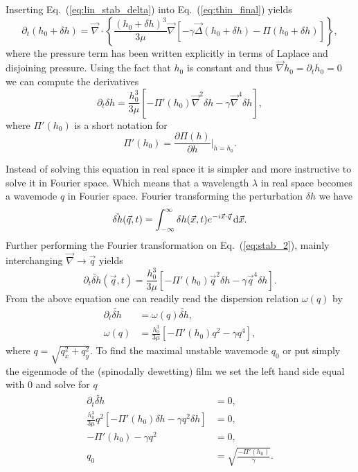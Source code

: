 Inserting Eq.~(\ref{eq:lin_stab_delta}) into Eq.~(\ref{eq:thin_final}) yields
\begin{equation}\label{eq:stab_1}
    \partial_t (h_0 + \delta h) = \vec{\nabla}\cdot\left\{\frac{(h_0 + \delta h)^3}{3\mu}\vec{\nabla} [-\gamma\vec{\Delta}(h_0 + \delta h) - \Pi(h_0 + \delta h)]\right\},
\end{equation}
where the pressure term has been written explicitly in terms of Laplace and disjoining pressure.
Using the fact that $h_0$ is constant and thus $\vec{\nabla} h_0 = \partial_t h_0= 0$ we can compute the derivatives
\begin{equation}\label{eq:stab_2}
    \partial_t \delta h = \frac{h_0^3}{3\mu}\left[-\Pi'(h_0)\vec{\nabla}^2\delta h -\gamma\vec{\nabla}^4\delta h\right],
\end{equation}
where $\Pi'(h_0)$ is a short notation for
\begin{equation}\label{eq:deriva_Pi}
    \Pi'(h_0) = \frac{\partial\Pi(h)}{\partial h}\bigg\rvert_{h=h_0}.
\end{equation}

Instead of solving this equation in real space it is simpler and more instructive to solve it in Fourier space.
Which means that a wavelength $\lambda$ in real space becomes a wavemode $q$ in Fourier space. 
Fourier transforming the perturbation $\delta h$ we have 
\begin{equation}\label{eq:fourier_h}
    \tilde{\delta h}(\vec{q},t) = \int_{-\infty}^{\infty} \delta h(\vec{x},t) e^{-i\vec{x}\cdot\vec{q}} \mathop{}\!\mathrm{d}\vec{x}.    
\end{equation}
Further performing the Fourier transformation on Eq.~(\ref{eq:stab_2}), mainly interchanging $\vec{\nabla} \rightarrow \vec{q}$ yields
\begin{equation}\label{eq:stab_3}
    \partial_t \tilde{\delta h}(\vec{q},t) = \frac{h_0^3}{3\mu}\left[-\Pi'(h_0)\vec{q}^2\delta h -\gamma\vec{q}^4\delta h\right].
\end{equation}
From the above equation one can readily read the dispersion relation $\omega(q)$ by 
\begin{align}
    \partial_t \tilde{\delta h} &= \omega(q)\tilde{\delta h}, \\
    \omega(q) &= \frac{h_0^3}{3\mu}\left[-\Pi'(h_0)q^2 -\gamma q^4\right], 
\end{align}
where $q = \sqrt{q_x^2 + q_y^2}$.
To find the maximal unstable wavemode $q_0$ or put simply the eigenmode of the (spinodally dewetting) film we set the left hand side equal with $0$ and solve for $q$
\begin{align}\label{eq:stab_4}
    \partial_t \tilde{\delta h} &= 0, \\
    \frac{h_0^3}{3\mu}q^2\left[-\Pi'(h_0)\delta h -\gamma q^2\delta h\right] &= 0, \\
    -\Pi'(h_0) -\gamma q^2 &= 0, \\
    q_0 &= \sqrt{\frac{-\Pi'(h_0)}{\gamma}} .
\end{align}

